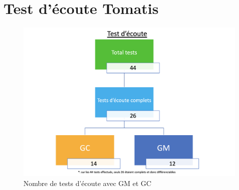  \section{Test d'écoute Tomatis\textsuperscript \textregistered }
 
 
 \begin{figure}[th]
 	\centering
 	\includegraphics[width=0.7\linewidth]{images/Testecoute.png}
 	\caption[Nombre de tests d'écoute avec GM et GC]{Nombre de tests d'écoute avec GM et GC}
 	
 \end{figure}

